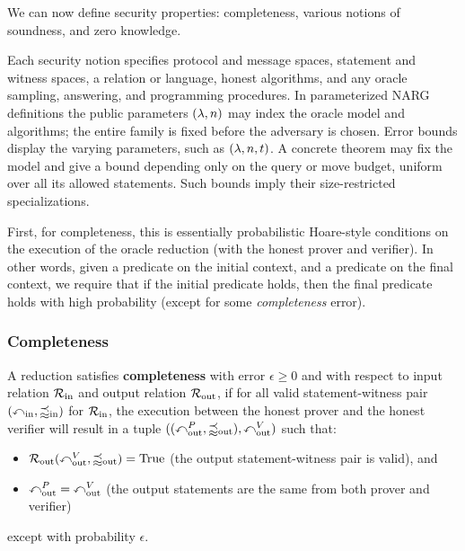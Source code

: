 We can now define security properties: completeness, various notions of soundness, and zero knowledge.

Each security notion specifies protocol and message spaces, statement and witness spaces, a relation or language, honest algorithms, and any oracle sampling, answering, and programming procedures. In parameterized NARG definitions the public parameters \((\lambda,n)\) may index the oracle model and algorithms; the entire family is fixed before the adversary is chosen. Error bounds display the varying parameters, such as \((\lambda,n,t)\). A concrete theorem may fix the model and give a bound depending only on the query or move budget, uniform over all its allowed statements. Such bounds imply their size-restricted specializations.

First, for completeness, this is essentially probabilistic Hoare-style conditions on the execution
of the oracle reduction (with the honest prover and verifier). In other words, given a predicate on
the initial context, and a predicate on the final context, we require that if the initial predicate
holds, then the final predicate holds with high probability (except for some \emph{completeness}
error).

\subsubsection{Completeness}

\begin{definition}[Completeness]
    \label{def:completeness}
    A reduction satisfies \textbf{completeness} with error \(\epsilon \geq 0\) and with respect to
    input relation \(\mathcal{R}_{\mathrm{in}}\) and output relation \(\mathcal{R}_{\mathrm{out}}\), if for all valid statement-witness pair
    \((\mathbb{x}_{\text{in}}, \mathbb{w}_{\text{in}})\) for \(\mathcal{R}_{\mathrm{in}}\), the execution between the honest prover and the honest verifier
    will result in a tuple \(((\mathbb{x}_{\text{out}}^P, \mathbb{w}_{\text{out}}), \mathbb{x}_{\text{out}}^V)\) such that:
    \begin{itemize}
        \item \(\mathcal{R}_{\mathrm{out}}(\mathbb{x}_{\text{out}}^V, \mathbb{w}_{\text{out}}) = \text{True}\) (the output statement-witness pair is valid), and
        \item \(\mathbb{x}_{\text{out}}^P = \mathbb{x}_{\text{out}}^V\) (the output statements are the same from both prover and verifier)
    \end{itemize}
    except with probability \(\epsilon\).
    \leanok
\end{definition}


